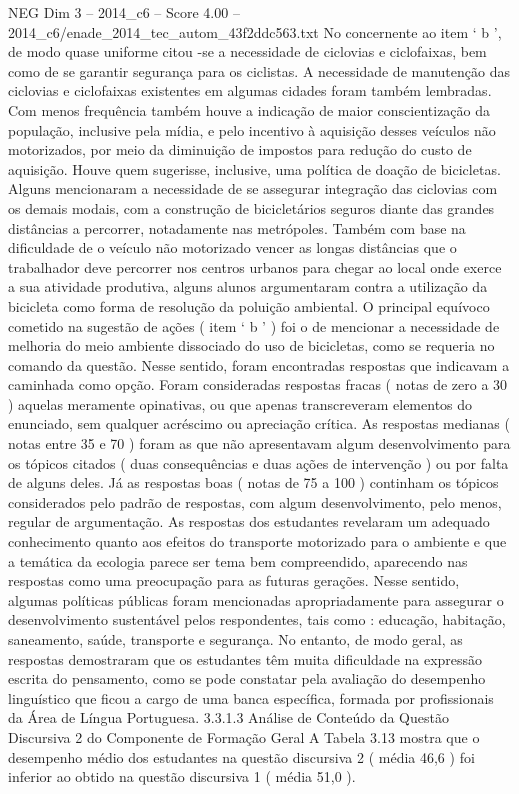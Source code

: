 \begin{textsample}{NEG Dim 3 – 2014\_c6 – Score 4.00 – 2014\_c6/enade\_2014\_tec\_autom\_43f2ddc563.txt}
No concernente ao item ‘ b ’, de modo quase uniforme citou -se a necessidade de ciclovias e ciclofaixas, bem como de se garantir segurança para os ciclistas.
A necessidade de manutenção das ciclovias e ciclofaixas existentes em algumas cidades foram também lembradas.
Com menos frequência também houve a indicação de maior conscientização da população, inclusive pela mídia, e pelo incentivo à aquisição desses veículos não motorizados, por meio da diminuição de impostos para redução do custo de aquisição.
Houve quem sugerisse, inclusive, uma política de doação de bicicletas.
Alguns mencionaram a necessidade de se assegurar integração das ciclovias com os demais modais, com a construção de bicicletários seguros diante das grandes distâncias a percorrer, notadamente nas metrópoles.
Também com base na dificuldade de o veículo não motorizado vencer as longas distâncias que o trabalhador deve percorrer nos centros urbanos para chegar ao local onde exerce a sua atividade produtiva, alguns alunos argumentaram contra a utilização da bicicleta como forma de resolução da poluição ambiental.
O principal equívoco cometido na sugestão de ações ( item ‘ b ’ ) foi o de mencionar a necessidade de melhoria do meio ambiente dissociado do uso de bicicletas, como se requeria no comando da questão.
Nesse sentido, foram encontradas respostas que indicavam a caminhada como opção.
Foram consideradas respostas fracas ( notas de zero a 30 ) aquelas meramente opinativas, ou que apenas transcreveram elementos do enunciado, sem qualquer acréscimo ou apreciação crítica.
As respostas medianas ( notas entre 35 e 70 ) foram as que não apresentavam algum desenvolvimento para os tópicos citados ( duas consequências e duas ações de intervenção ) ou por falta de alguns deles.
Já as respostas boas ( notas de 75 a 100 ) continham os tópicos considerados pelo padrão de respostas, com algum desenvolvimento, pelo menos, regular de argumentação.
As respostas dos estudantes revelaram um adequado conhecimento quanto aos efeitos do transporte motorizado para o ambiente e que a temática da ecologia parece ser tema bem compreendido, aparecendo nas respostas como uma preocupação para as futuras gerações.
Nesse sentido, algumas políticas públicas foram mencionadas apropriadamente para assegurar o desenvolvimento sustentável pelos respondentes, tais como : educação, habitação, saneamento, saúde, transporte e segurança.
No entanto, de modo geral, as respostas demostraram que os estudantes têm muita dificuldade na expressão escrita do pensamento, como se pode constatar pela avaliação do desempenho linguístico que ficou a cargo de uma banca específica, formada por profissionais da Área de Língua Portuguesa. 3.3.1.3 Análise de Conteúdo da Questão Discursiva 2 do Componente de Formação Geral A Tabela 3.13 mostra que o desempenho médio dos estudantes na questão discursiva 2 ( média 46,6 ) foi inferior ao obtido na questão discursiva 1 ( média 51,0 ).

\end{textsample}
